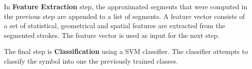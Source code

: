 
 
 In \textbf{Feature Extraction} step, the approximated segments that were computed in the previous step are appended to a list of segments. A feature vector consists of a set of statistical, geometrical and spatial features are extracted from the segmented strokes. The feature vector is used as input for the next step.   %
  
   The final step is \textbf{Classification} using a SVM classifier. The classifier attempts to classify the symbol into one the previously trained classes.
